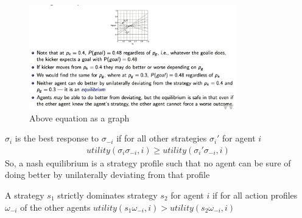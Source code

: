 \documentclass[a4paper]{article}
\theoremstyle{plain}
\theoremstyle{definition}
\newtheorem{defn}{Definition}[section]
\theoremstyle{remark}
\begin{document}
\begin{figure}[H]
	\centering
	\includegraphics[width=0.8\textwidth]{s3.png}
	\caption{Above equation as a graph}
	\label{fig:s3-png}
\end{figure}	
\begin{tcolorbox}[colback=black!3!white,colframe=black!60!white,title=\begin{defn}Nash Equilibrium \label{Nash Equilibrium}\end{defn}]
$\sigma_i$ is the best response to $\sigma_{-i}$ if for all other strategies $\sigma_{i}'$ for agent $i$
\begin{align}
utility(\sigma_i\sigma_{-i},i) \ge utility(\sigma_i'\sigma_{-i},i)
\end{align}
So, a nash equilibrium is a strategy profile such that no agent can be sure of doing better by unilaterally deviating from that profile
\end{tcolorbox}
\begin{tcolorbox}[colback=black!3!white,colframe=black!60!white,title=\begin{defn}Strictly Dominates \label{Strictly Dominates}\end{defn}]
A strategy $s_1$ strictly dominates strategy $s_2$ for agent $i$ if for all action profiles $\omega_{-i}$ of the other agents $utility(s_1\omega_{-i},i)>utility(s_2 \omega_{-i},i)$
\end{tcolorbox}
\end{document}
